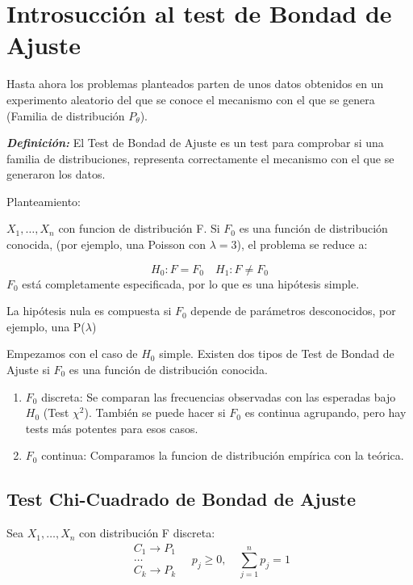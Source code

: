 \section{Introsucción al test de Bondad de Ajuste}

Hasta ahora los problemas planteados parten de unos datos obtenidos
en un experimento aleatorio del que se conoce el mecanismo con el que se genera (Familia de distribución $P_\theta$).

\textit{\textbf{Definición: }}El Test de Bondad de Ajuste es un test para comprobar si una familia de distribuciones,
 representa correctamente el mecanismo con el que se generaron los datos.

Planteamiento:

$X_1,\dots,X_n$ con funcion de distribución F. Si $F_0$ es una función de distribución conocida, (por ejemplo, una Poisson con $\lambda=3$), el problema se reduce a:

$$H_0: F=F_0 \quad H_1: F \neq F_0$$
$F_0$ está completamente especificada, por lo que es una hipótesis simple.

La hipótesis nula es compuesta si $F_0$ depende de parámetros desconocidos, por ejemplo, una P($\lambda$)

Empezamos con el caso de $H_0$ simple. Existen dos tipos de Test de Bondad de Ajuste si $F_0$ es una función de  distribución conocida.
\begin{enumerate}
    \item $F_0$ discreta: Se comparan las frecuencias observadas con las esperadas bajo $H_0$ (Test $\chi^2$). También se puede hacer si $F_0$ es continua agrupando, pero hay tests más potentes para esos casos.
    \item $F_0$ continua: Comparamos la funcion de distribución empírica con la teórica.
\end{enumerate}

\subsection{Test Chi-Cuadrado de Bondad de Ajuste} 

Sea $X_1,\dots,X_n$ con distribución F discreta:
\[
\begin{matrix}
    C_1 \to P_1\\
    \dots \\
    C_k \to P_k
\end{matrix}
\quad
p_j \geq 0,
\quad \sum_{j=1}^{n} p_j=1
\]

